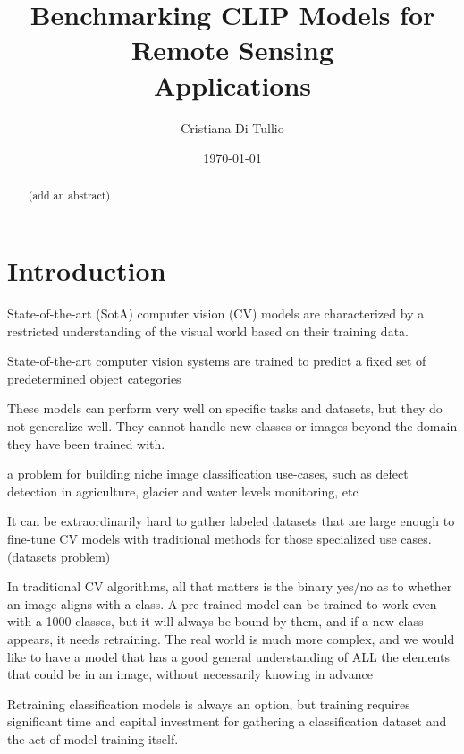 \documentclass[a4paper, oneside, english]{sapthesis}
\title{Benchmarking CLIP Models for Remote Sensing \\Applications}
\author{Cristiana Di Tullio}
\date{\today}
\begin{document}
\frontmatter
\maketitle
\dedication{(add a dedication)}

\begin{abstract}
    (add an abstract)
\end{abstract}

\tableofcontents

\mainmatter

\chapter{Introduction} %

State-of-the-art (SotA) computer vision (CV) models are characterized by a restricted understanding of the visual world based on their training data.

State-of-the-art computer vision systems are
trained to predict a fixed set of predetermined
object categories

These models can perform very well on specific tasks and datasets, but they do not generalize well. They cannot handle new classes or images beyond the domain they have been trained with.

a problem for building niche image classification use-cases, such as defect detection in agriculture, glacier and water levels monitoring, etc

 It can be extraordinarily hard to gather labeled datasets that are large enough to fine-tune CV models with traditional methods for those specialized use cases. (datasets problem)

In traditional CV algorithms, all that matters is the binary yes/no as to whether an image aligns with a class. A pre trained model can be trained to work even with a 1000 classes, but it will always be bound by them, and if a new class appears, it needs retraining. The real world is much more complex, and we would like to have a model that has a good general understanding of ALL the elements that could be in an image, without necessarily knowing in advance

Retraining classification models is always an option, but training requires significant time and capital investment for gathering a classification dataset and the act of model training itself.
\end{document}
